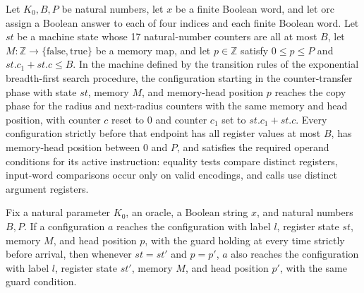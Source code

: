 \begin{theorem}
\label{Complexity.LogProg.ExpBFS.mv_run}
\leanok
{}
Let $K_0,B,P$ be natural numbers, let $x$ be a finite Boolean word, and let
$\mathrm{orc}$ assign a Boolean answer to each of four indices and each finite Boolean
word. Let $st$ be a machine state whose 17 natural-number counters are all at most $B$,
let $M:\mathbb Z\to\{\mathrm{false},\mathrm{true}\}$ be a memory map, and let
$p\in\mathbb Z$ satisfy $0\le p\le P$ and $st.c_1+st.c\le B$. In the machine defined by
the transition rules of the exponential breadth-first search procedure, the
configuration starting in the counter-transfer phase with state $st$, memory $M$, and
memory-head position $p$ reaches the copy phase for the radius and next-radius counters
with the same memory and head position, with counter $c$ reset to $0$ and counter $c_1$
set to $st.c_1+st.c$. Every configuration strictly before that endpoint has all register
values at most $B$, has memory-head position between $0$ and $P$, and satisfies the
required operand conditions for its active instruction: equality tests compare distinct
registers, input-word comparisons occur only on valid encodings, and calls use distinct
argument registers.
\end{theorem}

\begin{lemma}
\label{Complexity.LogProg.ExpBFS.reach_cf}
\leanok
{}
Fix a natural parameter $K_0$, an oracle, a Boolean string $x$, and natural numbers
$B,P$. If a configuration $a$ reaches the configuration with label $l$, register state
$st$, memory $M$, and head position $p$, with the guard holding at every time strictly
before arrival, then whenever $st=st'$ and $p=p'$, $a$ also reaches the configuration
with label $l$, register state $st'$, memory $M$, and head position $p'$, with the same
guard condition.
\end{lemma}

